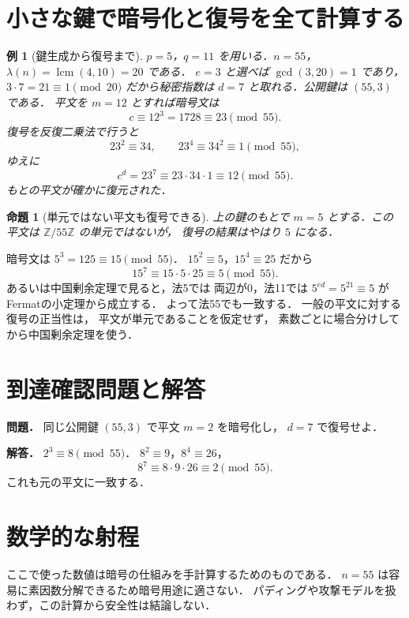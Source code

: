 \documentclass[a5paper,10pt,onecolumn]{jsarticle}
\makeatletter
\theoremstyle{mathnotetheorem}
\newtheorem{proposition}[theorem]{命題}
\newtheorem{example}[theorem]{例}
\renewcommand{\proofname}{証明}
\renewenvironment{proof}[1][\proofname]{%
  \par\pushQED{\qed}\normalfont\topsep4\p@\@plus2\p@\relax
  \trivlist\item[\hskip\labelsep\bfseries #1]\ignorespaces
}{\popQED\endtrivlist\@endpefalse}
\makeatother
\begin{document}
\section{小さな鍵で暗号化と復号を全て計算する}
\begin{example}[鍵生成から復号まで]
$p=5$，$q=11$ を用いる．$n=55$，
$\lambda(n)=\operatorname{lcm}(4,10)=20$ である．
$e=3$ と選べば $\gcd(3,20)=1$ であり，
$3\cdot7=21\equiv1\pmod{20}$ だから秘密指数は
$d=7$ と取れる．公開鍵は $(55,3)$ である．
平文を $m=12$ とすれば暗号文は
\[
 c\equiv12^3=1728\equiv23\pmod{55}.
\]
復号を反復二乗法で行うと
\[
 23^2\equiv34,\qquad
 23^4\equiv34^2\equiv1\pmod{55},
\]
ゆえに
\[
 c^d=23^7\equiv23\cdot34\cdot1
       \equiv12\pmod{55}.
\]
もとの平文が確かに復元された．
\end{example}
\begin{proposition}[単元ではない平文も復号できる]
上の鍵のもとで $m=5$ とする．この平文は
$\mathbb Z/55\mathbb Z$ の単元ではないが，
復号の結果はやはり $5$ になる．
\end{proposition}
\begin{proof}
暗号文は $5^3=125\equiv15\pmod{55}$．
$15^2\equiv5$，$15^4\equiv25$ だから
\[
 15^7\equiv15\cdot5\cdot25\equiv5\pmod{55}.
\]
あるいは中国剰余定理で見ると，法5では
両辺が0，法11では $5^{ed}=5^{21}\equiv5$
がFermatの小定理から成立する．
よって法55でも一致する．
一般の平文に対する復号の正当性は，
平文が単元であることを仮定せず，
素数ごとに場合分けしてから中国剰余定理を使う．
\end{proof}
\section*{到達確認問題と解答}
\noindent\textbf{問題．}
同じ公開鍵 $(55,3)$ で平文 $m=2$ を暗号化し，
$d=7$ で復号せよ．

\medskip\noindent\textbf{解答．}
$2^3\equiv8\pmod{55}$．
$8^2\equiv9$，$8^4\equiv26$，
\[
 8^7\equiv8\cdot9\cdot26\equiv2\pmod{55}.
\]
これも元の平文に一致する．
\section*{数学的な射程}
ここで使った数値は暗号の仕組みを手計算するためのものである．
$n=55$ は容易に素因数分解できるため暗号用途に適さない．
パディングや攻撃モデルを扱わず，この計算から安全性は結論しない．
\end{document}
